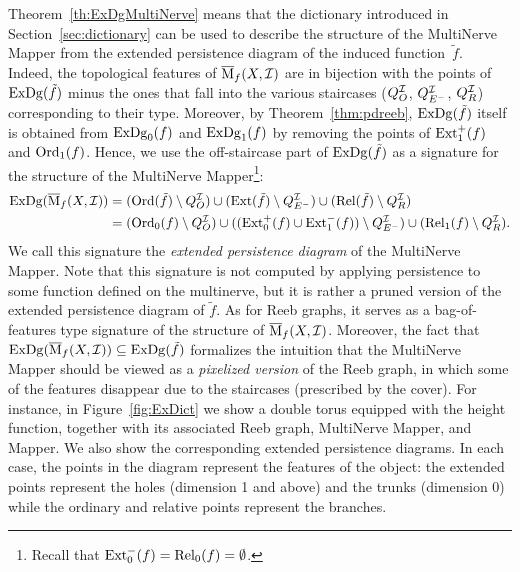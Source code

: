 Theorem~\ref{th:ExDgMultiNerve} means that the dictionary
introduced in Section~\ref{sec:dictionary} can be used to describe
the structure of the MultiNerve Mapper from the extended persistence
diagram of the induced function~$\tilde f$. 
Indeed, the topological features of $\overline{\mathrm{M}}_f(X,\mathcal{I})$
are in bijection with the points of
$\mathrm{ExDg}(\tilde f)$ minus the ones that fall into the various
staircases ($Q_O^{\mathcal{I}}$, $Q_{E^-}^{\mathcal{I}}$, $Q_R^{\mathcal{I}}$) corresponding to their type. 
Moreover, by Theorem~\ref{thm:pdreeb}, $\mathrm{ExDg}(\tilde f)$ itself is
obtained from $\mathrm{ExDg}_0(f)$ and $\mathrm{ExDg}_1(f)$ by removing the points of
$\mathrm{Ext}_1^+(f)$ and $\mathrm{Ord}_1(f)$.
Hence, we use the off-staircase part of
$\mathrm{ExDg}(\tilde f)$ as a signature for the structure of the MultiNerve
Mapper\footnote{Recall that $\mathrm{Ext}_0^-(f)=\mathrm{Rel}_0(f)=\emptyset$.}:
%
\begin{align}\label{eq:sign1}
\begin{split}
\mathrm{ExDg}(\overline{\mathrm{M}}_f(X,\mathcal{I}))&=
(\mathrm{Ord}(\tilde{f})\setminus Q_O^{\mathcal{I}})\cup
(\mathrm{Ext}(\tilde{f})\setminus Q_{E^-}^{\mathcal{I}})\cup
(\mathrm{Rel}(\tilde{f})\setminus Q_R^{\mathcal{I}})\\
&=
(\mathrm{Ord}_0(f)\setminus Q_O^{\mathcal{I}})\cup
((\mathrm{Ext}_0^+(f)\cup \mathrm{Ext}_1^-(f))\setminus Q_{E^-}^{\mathcal{I}})\cup
(\mathrm{Rel}_1(f)\setminus Q_R^{\mathcal{I}}).
\end{split}
\end{align}
%
We call this signature the {\em extended persistence diagram} of the MultiNerve Mapper.  
Note that this signature is not computed by applying persistence
to some function defined on the multinerve, but it is rather
a pruned version of the extended persistence diagram of ${\tilde f}$. 
As for Reeb graphs,
it serves as a bag-of-features type signature of the structure of
$\overline{\mathrm{M}}_f(X, \mathcal{I})$. 
%
Moreover, the fact that $\mathrm{ExDg}(\overline{\mathrm{M}}_f(X, \mathcal{I})) \subseteq \mathrm{ExDg}(\tilde
f)$ formalizes the intuition that the MultiNerve Mapper should be
viewed as a {\em pixelized version} of the Reeb graph, in which some
of the features disappear due to the staircases (prescribed by the cover). 
%
For instance, in Figure~\ref{fig:ExDict} we show a double torus
equipped with the height function, together with its associated Reeb
graph, MultiNerve Mapper, and Mapper. We also show the corresponding
extended persistence diagrams.  In each case, the points in the diagram
represent the features of the object: the extended points represent
the holes (dimension 1 and above) and the trunks (dimension 0) while
the ordinary and relative points represent the branches.

